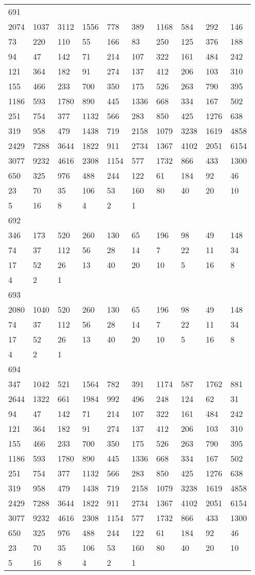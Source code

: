 \begin{longtable}{*{10}{l}}
691&&&&&&&&&\\
2074& 1037& 3112& 1556& 778& 389& 1168& 584& 292& 146\\
73& 220& 110& 55& 166& 83& 250& 125& 376& 188\\
94& 47& 142& 71& 214& 107& 322& 161& 484& 242\\
121& 364& 182& 91& 274& 137& 412& 206& 103& 310\\
155& 466& 233& 700& 350& 175& 526& 263& 790& 395\\
1186& 593& 1780& 890& 445& 1336& 668& 334& 167& 502\\
251& 754& 377& 1132& 566& 283& 850& 425& 1276& 638\\
319& 958& 479& 1438& 719& 2158& 1079& 3238& 1619& 4858\\
2429& 7288& 3644& 1822& 911& 2734& 1367& 4102& 2051& 6154\\
3077& 9232& 4616& 2308& 1154& 577& 1732& 866& 433& 1300\\
650& 325& 976& 488& 244& 122& 61& 184& 92& 46\\
23& 70& 35& 106& 53& 160& 80& 40& 20& 10\\
5& 16& 8& 4& 2& 1& \\

692&&&&&&&&&\\
346& 173& 520& 260& 130& 65& 196& 98& 49& 148\\
74& 37& 112& 56& 28& 14& 7& 22& 11& 34\\
17& 52& 26& 13& 40& 20& 10& 5& 16& 8\\
4& 2& 1& \\

693&&&&&&&&&\\
2080& 1040& 520& 260& 130& 65& 196& 98& 49& 148\\
74& 37& 112& 56& 28& 14& 7& 22& 11& 34\\
17& 52& 26& 13& 40& 20& 10& 5& 16& 8\\
4& 2& 1& \\

694&&&&&&&&&\\
347& 1042& 521& 1564& 782& 391& 1174& 587& 1762& 881\\
2644& 1322& 661& 1984& 992& 496& 248& 124& 62& 31\\
94& 47& 142& 71& 214& 107& 322& 161& 484& 242\\
121& 364& 182& 91& 274& 137& 412& 206& 103& 310\\
155& 466& 233& 700& 350& 175& 526& 263& 790& 395\\
1186& 593& 1780& 890& 445& 1336& 668& 334& 167& 502\\
251& 754& 377& 1132& 566& 283& 850& 425& 1276& 638\\
319& 958& 479& 1438& 719& 2158& 1079& 3238& 1619& 4858\\
2429& 7288& 3644& 1822& 911& 2734& 1367& 4102& 2051& 6154\\
3077& 9232& 4616& 2308& 1154& 577& 1732& 866& 433& 1300\\
650& 325& 976& 488& 244& 122& 61& 184& 92& 46\\
23& 70& 35& 106& 53& 160& 80& 40& 20& 10\\
5& 16& 8& 4& 2& 1& \\


\end{longtable}
